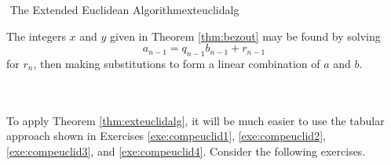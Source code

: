     \begin{theorem}{\Stop\,\,The Extended Euclidean Algorithm}{exteuclidalg}
        
        The integers \(x\) and \(y\) given in Theorem \ref{thm:bezout} may be found by solving
        \begin{equation*}
            a_{n-1}=q_{n-1}b_{n-1}+r_{n-1}
        \end{equation*}
        for \(r_n\), then making substitutions to form a linear combination of \(a\) and \(b\).
    \end{theorem}
    \vphantom
    \\
    \\
    To apply Theorem \ref{thm:exteuclidalg}, it will be much easier to use the tabular approach shown in Exercises \ref{exe:compeuclid1}, \ref{exe:compeuclid2}, \ref{exe:compeuclid3}, and \ref{exe:compeuclid4}. Consider the following exercises.
